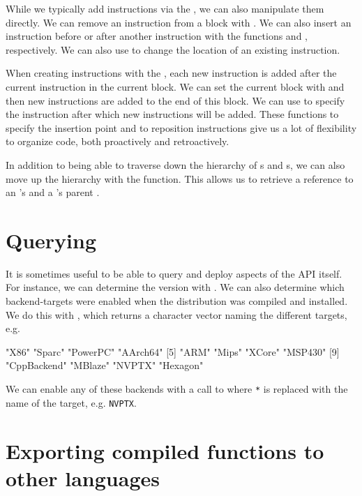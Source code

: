 \documentclass[article]{jss}
\begin{document}
While we typically add instructions via the , we can
also manipulate them directly.  We can remove an instruction from a
block with .  We can also insert an instruction
before or after another instruction with the functions
 and , respectively.  We can
also use  to change the location of an existing
instruction.

When creating instructions with the , each new
instruction is added after the current instruction in the current
block.  We can set the current block with  and
then new instructions are added to the end of this block.  We can use
 to specify the instruction after which new
instructions will be added.  These functions to specify the insertion
point and to reposition instructions give us a lot of flexibility to
organize code, both proactively and retroactively.


In addition to being able to traverse down the hierarchy of
s and s, we can also move up
the hierarchy with the  function.  This allows us to
retrieve a reference to an 's 
and a 's parent .



\section[Querying LLVM]{Querying \llvm}
It is sometimes useful to be able to query and deploy aspects
of the \llvm{} API itself.
For instance,  we can determine the version with 
.
We can also determine which backend-targets were enabled
when the \llvm{} distribution was compiled and installed.
We do this with , which returns 
a character vector naming the different targets, e.g.
\begin{ROutput}
 [1] "X86"        "Sparc"      "PowerPC"    "AArch64"   
 [5] "ARM"        "Mips"       "XCore"      "MSP430"    
 [9] "CppBackend" "MBlaze"     "NVPTX"      "Hexagon"  
\end{ROutput}
We can enable any of these backends with a call to 
 where \texttt{*} is replaced
with the name of the target, e.g. \texttt{NVPTX}.


\section[Exporting compiled R functions to other languages]{Exporting compiled \R{} functions to other languages}
\end{document}
